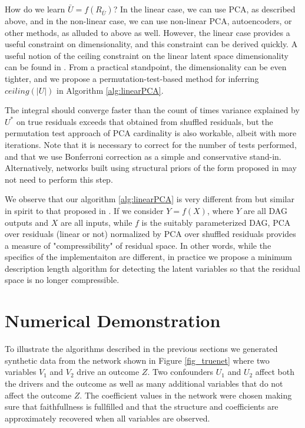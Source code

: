 \documentclass{article}
\begin{document}
How do we learn $\bar{U} = f(R_{\bar{U}})$?  In the linear case, we can use PCA, as described above, and in the non-linear case, we can use non-linear PCA, autoencoders, or other methods, as alluded to above as well.  However, the linear case provides a useful constraint on dimensionality, and this constraint can be derived quickly.  A useful notion of the ceiling constraint on the linear latent space dimensionality can be found in \cite{gavish_optimal_2014}.  From a practical standpoint, the dimensionality can be even tighter, and we propose a permutation-test-based method for inferring $ceiling(|U|)$ in Algorithm \ref{alg:linearPCA}.

The integral should converge faster than the count of times variance explained by $U^{*}$ on true residuals exceeds that obtained from shuffled residuals, but the permutation test approach of PCA cardinality is also workable, albeit with more iterations.  Note that it is necessary to correct for the number of tests performed, and that we use Bonferroni correction as a simple and conservative stand-in. Alternatively, networks built using structural priors of the form proposed in \cite{friedman_being_2013} may not need to perform this step.

We observe that our algorithm \ref{alg:linearPCA} is very different from but similar in spirit to that proposed in \cite{elidan_learning_2005}.  If we consider $Y = f(X)$, where $Y$ are all DAG outputs and $X$ are all inputs, while $f$ is the suitably parameterized DAG, PCA over residuals (linear or not) normalized by PCA over shuffled residuals provides a measure of "compressibility" of residual space.  In other words, while the specifics of the implementaiton are different, in practice we propose a minimum description length algorithm for detecting the latent variables so that the residual space is no longer compressible.

\section{Numerical Demonstration}
To illustrate  the algorithms described in the previous sections we
generated synthetic data from the network shown in Figure
\ref{fig_truenet} where two variables $V_1$ and $V_2$ drive an outcome
$Z$. Two confounders $U_1$ and $U_2$ affect both the drivers and the
outcome as well as many additional variables that do not affect the
outcome $Z$.
The coefficient values in the network were chosen
making sure that faithfullness is fullfilled and that the structure
and coefficients are approximately recovered
when all variables are observed.
\end{document}
